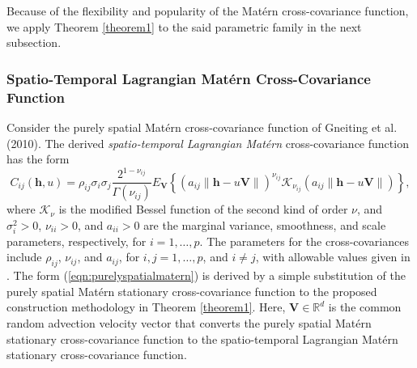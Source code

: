 \documentclass[12pt]{article}
\newcommand{\0}{\mathbf{0}}
\begin{document}
Because of the flexibility and popularity of the Mat\'{e}rn cross-covariance function, we apply Theorem \ref{theorem1} to the said parametric family in the next subsection.

\subsubsection{Spatio-Temporal Lagrangian Mat\'{e}rn Cross-Covariance Function}

Consider the purely spatial Mat\'{e}rn cross-covariance function of Gneiting et al. (2010). The derived \textit{spatio-temporal Lagrangian Mat\'{e}rn} cross-covariance function has the form
\begin{equation}\label{eqn:purelyspatialmatern}
C_{ij}(\mathbf{h},u)= \rho_{ij} \sigma_{i}\sigma_{j}\frac{2^{1-\nu_{ij}}}{\Gamma\left(\nu_{ij}\right)}E_{\mathbf{V}} \left\{\left(a_{ij}\|\mathbf{h}-u\mathbf{V}\|\right)^{\nu_{ij}}\mathcal{K}_{\nu_{ij}}\left(a_{ij}\|\mathbf{h}-u\mathbf{V}\|\right)\right\},
\end{equation}
where $\mathcal{K}_\nu$ is the modified Bessel function of the second kind of order $\nu$, and $\sigma_{i}^{2}>0$, $\nu_{ii}>0$, and $a_{ii}>0$ are the marginal variance, smoothness, and scale parameters, respectively, for $i=1,\ldots,p$.  The parameters for the cross-covariances include $\rho_{ij}$, $\nu_{ij}$, and $a_{ij}$, for $i,j=1,\ldots,p$, and $i\neq j$, with allowable values given in \citet{gneiting2010matern}. The form (\ref{eqn:purelyspatialmatern}) is derived by a simple substitution of the purely spatial Mat\'{e}rn stationary cross-covariance function to the proposed construction methodology in Theorem \ref{theorem1}.  Here, $\mathbf{V}\in \mathbb{R}^d$ is the common random advection velocity vector that converts the purely spatial Mat\'{e}rn stationary cross-covariance function to the spatio-temporal Lagrangian Mat\'{e}rn stationary cross-covariance function.
\end{document}
